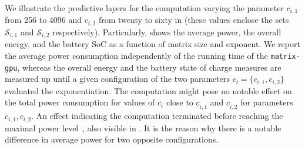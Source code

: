 We illustrate the predictive layers for the computation varying the parameter $c_{i,1}$ from 256 to 4096 and $c_{i,2}$ from twenty to sixty in  (these values enclose the sets $\mathcal{S}_{i,1}$ and $\mathcal{S}_{i,2}$ respectively). Particularly,  shows the average power,  the overall energy, and  the battery SoC as a function of matrix size and exponent. We report the average power consumption independently of the running time of the {\small\tt matrix-gpu}, whereas the overall energy and the battery state of charge measures are measured up until a given configuration of the two parameters $c_{i}=\{c_{i,1},c_{i,2}\}$ evaluated the exponentiation. The computation might pose no notable effect on the total power consumption for values of $c_{i}$ close to $\underline{c}_{i,1}$ and $\underline{c}_{i,2}$ for parameters $c_{i,1},c_{i,2}$. An effect indicating the computation terminated before reaching the maximal power level~\citep{seewald2019coarse}, also visible in . It is the reason why there is a notable difference in average power for two opposite configurations.

